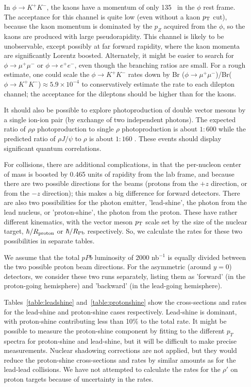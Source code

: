 \documentclass[../report.tex]{subfiles}
\begin{document}
In $\phi \rightarrow K^+K^-$, the kaons have a momentum of only 135 \UMeVc\ in the $\phi$ rest frame.   The acceptance for this channel is quite low (even without a kaon $p\sb{\scriptstyle\mathrm{T}}$ cut), because the kaon momentum is dominated by the $p_Z$ acquired from the $\phi$, so the kaons are produced with large pseudorapidity.   This channel is likely to be unobservable, except possibly at far forward rapidity, where the kaon momenta are significantly Lorentz boosted.  Alternately, it might be easier to search for $\phi \rightarrow \mu^+ \mu^-$ or $\phi \rightarrow e^+ e^-$, even though the branching ratios are small. For a rough estimate, one could scale the $\phi\rightarrow K^+K^-$ rates down by Br ($\phi \rightarrow \mu^+ \mu^-$)/Br($\phi \rightarrow K^+K^-$)$\approx 5.9 \times 10^{-4}$ to conservatively estimate the rate to each dilepton channel; the acceptance for the dileptons should be higher than for the kaons. 

It should also be possible to explore photoproduction of double vector mesons by a single ion-ion pair (by exchange of two independent photons).   The expected ratio of $\rho\rho$ photoproduction to single $\rho$ photoproduction is about $1:600$ while the predicted ratio of $\rho J/\psi$ to $\rho$ is about $1:160$ \cite{Klein:1999qj}.  
These events should display significant quantum correlations.  

For \pPb collisions, there are additional complications, in that the per-nucleon center of mass is boosted by 0.465 units of rapidity from the lab frame, and because there are two possible directions for the beams (protons from the $+z$ direction, or from the $-z$ direction); this makes a big difference for forward detectors.  There are also two possibilities for the photon emitter, 'lead-shine', the photon from the lead nucleus, or 'proton-shine', the photon from the proton.  These have rather different kinematics, with the vector meson $p\sb{\scriptstyle\mathrm{T}}$ scale set by the size of the nuclear target, $\hbar/R_{\rm proton}$ or $\hbar/R_{\rm Pb}$ respectively.    So, we calculate the rates for these two possibilities in separate tables.

We assume that the total $pPb$ luminosity of 2000 nb$^{-1}$ is equally divided between the two possible proton beam directions.  For the asymmetric (around $y=0$) detectors, we consider these two runs separately, listing them as 'forward' (in the proton-going hemisphere) and 'backward' (in the lead-going hemisphere).  

Tables~\ref{table:leadshine} and~\ref{table:protonshine} show the cross-sections and rates for the lead-shine and proton-shine cases respectively.   Lead-shine is dominant, with proton-shine contributing less than 10\% to the total rate.  It might be possible to measure the proton-shine component by fitting to the different $p_T$ spectra for proton-shine and lead-shine, but it will be difficult to make precise measurements.   Nuclear shadowing corrections are not applied, but they would reduce the proton-shine cross-sections and rates by similar amounts as for the lead-lead collisions.   We have not attempted to calculate the rates for the $\rho'$ on proton targets because of uncertainty in the rates.  
\end{document}

